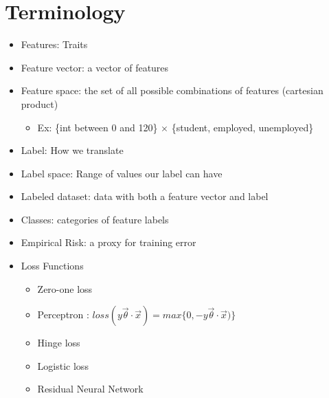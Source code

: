
\section{Terminology}
\begin{itemize}
    \item Features: Traits
    \item Feature vector: a vector of features
    \item Feature space: the set of all possible combinations of features (cartesian product)
    \begin{itemize}
        \item Ex: \{int between 0 and 120\} $\times$ \{student, employed, unemployed\}
    \end{itemize}
    \item Label: How we translate
    \item Label space: Range of values our label can have
    \item Labeled dataset: data with both a feature vector and label
    \item Classes: categories of feature labels
    \item Empirical Risk: a proxy for training error
    \item Loss Functions
    \begin{itemize}
        \item Zero-one loss
        \item Perceptron : $loss(y\vec\theta \cdot \vec x) =max \{0, -y \vec \theta \cdot \vec x)\}$
        \item Hinge loss
        \item Logistic loss
        \item Residual Neural Network
    \end{itemize}
\end{itemize}